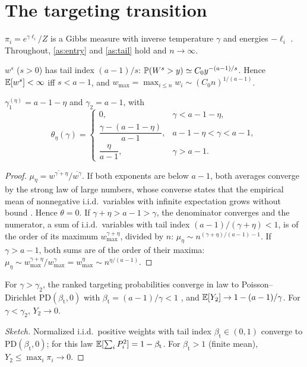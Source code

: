 \section{The targeting transition}\label{sec:transition}
$\pi_i=e^{\gamma\ell_i}/Z$ is a Gibbs measure with inverse temperature $\gamma$ and
energies $-\ell_i$ \cite{derrida1981random}. Throughout, \ref{as:entry} and
\ref{as:tail} hold and $n\to\infty$.

\begin{lemma}
$w^s$ ($s>0$) has tail index $(a-1)/s$: $\mathbb{P}(W^s>y)\simeq C_0y^{-(a-1)/s}$. Hence
$\mathbb{E}[w^s]<\infty$ iff $s<a-1$, and $w_{\max}=\max_{i\le n}w_i\sim(C_0n)^{1/(a-1)}$.
\end{lemma}

\begin{proposition}
$\gamma_1^{(\eta)}=a-1-\eta$ and $\gamma_2=a-1$, with
\[
\theta_\eta(\gamma)=\begin{cases}0,&\gamma<a-1-\eta,\\ \dfrac{\gamma-(a-1-\eta)}{a-1},&a-1-\eta<\gamma<a-1,\\[4pt] \dfrac{\eta}{a-1},&\gamma>a-1.\end{cases}
\]
\end{proposition}
\begin{proof}
$\mu_\eta=\overline{w^{\gamma+\eta}}/\overline{w^\gamma}$. If both exponents are below $a-1$, both
averages converge by the strong law of large numbers, whose converse
states that the empirical mean of nonnegative i.i.d.\ variables with infinite
expectation grows without bound \cite{durrett2019probability}. Hence $\theta=0$. If $\gamma+\eta>a-1>\gamma$, the denominator
converges and the numerator, a sum of i.i.d.\ variables with tail index
$(a-1)/(\gamma+\eta)<1$, is of the order of its maximum $w_{\max}^{\gamma+\eta}$, divided by
$n$: $\mu_\eta\sim n^{(\gamma+\eta)/(a-1)-1}$. If $\gamma>a-1$, both sums are of the order of
their maxima: $\mu_\eta\sim w_{\max}^{\gamma+\eta}/w_{\max}^{\gamma}=w_{\max}^\eta\sim n^{\eta/(a-1)}$.
\end{proof}

\begin{proposition}[condensation]
For $\gamma>\gamma_2$, the ranked targeting probabilities converge in law to
Poisson--Dirichlet $\mathrm{PD}(\beta_{\mathrm t},0)$ with $\beta_{\mathrm t}=(a-1)/\gamma<1$
\cite{pitman1997two}, and $\mathbb{E}[Y_2]\to1-(a-1)/\gamma$. For $\gamma<\gamma_2$, $Y_2\to0$.
\end{proposition}
\begin{proof}[Sketch]
Normalized i.i.d.\ positive weights with tail index $\beta_{\mathrm t}\in(0,1)$ converge to
$\mathrm{PD}(\beta_{\mathrm t},0)$; for this law $\mathbb{E}[\sum_iP_i^2]=1-\beta_{\mathrm t}$. For
$\beta_{\mathrm t}>1$ (finite mean), $Y_2\le\max_i\pi_i\to0$.
\end{proof}

